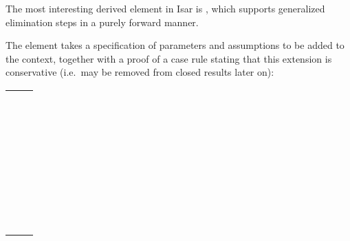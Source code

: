 \begin{isabellebody}
\begin{isamarkuptext}
  \medskip The most interesting derived element in Isar is \hyperlink{command.obtain}{\mbox{}} \cite[\S5.3]{Wenzel-PhD}, which supports generalized
  elimination steps in a purely forward manner.

  The \hyperlink{command.obtain}{\mbox{}} element takes a specification of parameters
   and assumptions  to be added to
  the context, together with a proof of a case rule stating that this
  extension is conservative (i.e.\ may be removed from closed results
  later on):

  \medskip
  \begin{tabular}{l}
  \isa{{\isachardoublequote}{\isasymlangle}facts{\isasymrangle}{\isachardoublequote}}~~\hyperlink{command.obtain}{\mbox{\isa{\isacommand{obtain}}}}~\isa{{\isachardoublequote}\isactrlvec x\ {\isasymWHERE}\ \isactrlvec A\ \isactrlvec x\ \ {\isasymlangle}proof{\isasymrangle}\ {\isasymequiv}{\isachardoublequote}} \\[0.5ex]
  \quad \hyperlink{command.have}{\mbox{\isa{\isacommand{have}}}}~\isa{{\isachardoublequote}case{\isacharcolon}\ {\isasymAnd}thesis{\isachardot}\ {\isacharparenleft}{\isasymAnd}\isactrlvec x{\isachardot}\ \isactrlvec A\ \isactrlvec x\ {\isasymLongrightarrow}\ thesis{\isacharparenright}\ {\isasymLongrightarrow}\ thesis{\isasymrangle}{\isachardoublequote}} \\
  \quad \hyperlink{command.proof}{\mbox{\isa{\isacommand{proof}}}}~\hyperlink{method.-}{\mbox{\isa{{\isacharminus}}}} \\
  \qquad \hyperlink{command.fix}{\mbox{\isa{\isacommand{fix}}}}~\isa{thesis} \\
  \qquad \hyperlink{command.assume}{\mbox{\isa{\isacommand{assume}}}}~\isa{{\isachardoublequote}{\isacharbrackleft}intro{\isacharbrackright}{\isacharcolon}\ {\isasymAnd}\isactrlvec x{\isachardot}\ \isactrlvec A\ \isactrlvec x\ {\isasymLongrightarrow}\ thesis{\isachardoublequote}} \\
  \qquad \hyperlink{command.show}{\mbox{\isa{\isacommand{show}}}}~\isa{thesis}~\hyperlink{command.using}{\mbox{\isa{\isacommand{using}}}}\isa{{\isachardoublequote}{\isasymlangle}facts{\isasymrangle}\ {\isasymlangle}proof{\isasymrangle}{\isachardoublequote}} \\
  \quad \hyperlink{command.qed}{\mbox{\isa{\isacommand{qed}}}} \\
  \quad \hyperlink{command.fix}{\mbox{\isa{\isacommand{fix}}}}~\isa{{\isachardoublequote}\isactrlvec x\ {\isasymASSM}\ {\isasymguillemotleft}elimination\ case{\isasymguillemotright}\ \isactrlvec A\ \isactrlvec x{\isachardoublequote}} \\
  \end{tabular}
  \medskip


\end{isamarkuptext}
\end{isabellebody}
